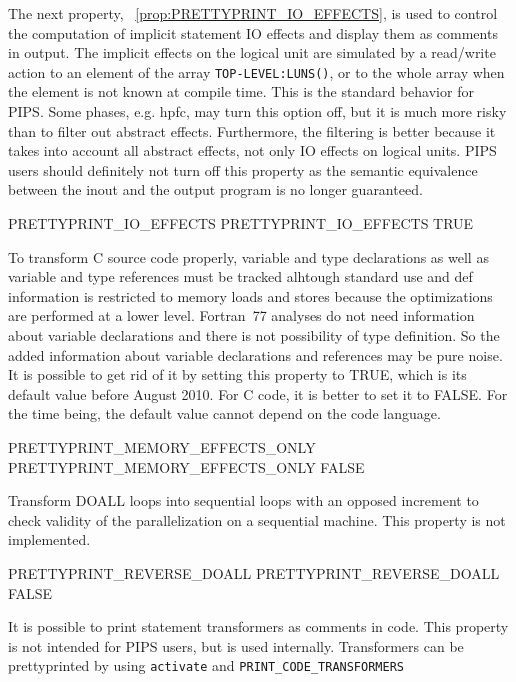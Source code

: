 \documentclass[a4paper]{report}
\newcommand{\PipsPropRef}[1]{\texttt{\detokenize{#1}}~\ref{prop:#1}}
\begin{document}
The next property, \PipsPropRef{PRETTYPRINT_IO_EFFECTS}, is used to control
the computation of implicit statement IO effects and display them as
comments in output. The implicit effects on the logical unit are
simulated by a read/write action to an element of the array
\verb/TOP-LEVEL:LUNS()/, or to the whole array when the element is not
known at compile time. This is the standard behavior for PIPS. Some
phases, e.g. hpfc, may turn this option off, but it is much more risky
than to filter out abstract effects. Furthermore, the filtering is
better because it takes into account all abstract effects, not only IO
effects on logical units. PIPS users should definitely not turn off
this property as the semantic equivalence between the inout and the
output program is no longer guaranteed.

\begin{PipsProp}{PRETTYPRINT_IO_EFFECTS}
PRETTYPRINT_IO_EFFECTS TRUE
\end{PipsProp}

To transform C source code properly, variable and type declarations as
well as variable and type references must be tracked alhtough standard
use and def information is restricted to memory loads and stores
because the optimizations are performed at a lower level. Fortran~77
analyses do not need information about variable declarations and there
is not possibility of type definition. So the added information about
variable declarations and references may be pure noise. It is possible
to get rid of it by setting this property to TRUE, which is its
default value before August 2010. For C code, it is better to set it
to FALSE. For the time being, the default value cannot depend on the
code language.

\begin{PipsProp}{PRETTYPRINT_MEMORY_EFFECTS_ONLY}
PRETTYPRINT_MEMORY_EFFECTS_ONLY FALSE
\end{PipsProp}


Transform DOALL loops into sequential loops with an opposed increment
to check validity of the parallelization on a sequential machine. This
property is not implemented.

\begin{PipsProp}{PRETTYPRINT_REVERSE_DOALL}
PRETTYPRINT_REVERSE_DOALL FALSE
\end{PipsProp}

It is possible to print statement transformers as comments in
code. This property is not intended for PIPS users, but is used
internally. Transformers can be prettyprinted by using \verb/activate/
and \verb/PRINT_CODE_TRANSFORMERS/
\end{document}
